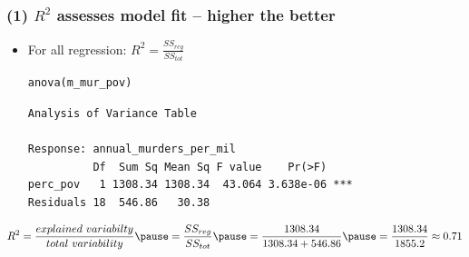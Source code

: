 \documentclass[slidestop,compress,mathserif,12pt,t,professionalfonts,xcolor=table]{beamer}
\begin{document}
\begin{frame}[fragile]
\frametitle{(1) $R^2$ assesses model fit -- higher the better}

\begin{itemize}

\item For all regression: $R^2 = \frac{SS_{reg}}{SS_{tot}}$

{\tiny
\begin{Verbatim}[frame=single, formatcom=\color{blue}]
anova(m_mur_pov)
\end{Verbatim}
}

{\tiny
\begin{Verbatim}[frame=single, formatcom=\color{gray}]
Analysis of Variance Table

Response: annual_murders_per_mil
          Df  Sum Sq Mean Sq F value    Pr(>F)    
perc_pov   1 1308.34 1308.34  43.064 3.638e-06 ***
Residuals 18  546.86   30.38  
\end{Verbatim}
}

\end{itemize}



\begin{adjustwidth}{-0.25cm}{0cm}
{\tiny
\[ R^2 = \frac{explained~variabilty}{total~variability} \pause =\frac{SS_{reg}}{SS_{tot}} \pause = \frac{1308.34}{1308.34 + 546.86} \pause = \frac{1308.34}{1855.2} \approx 0.71 \]
}
\end{adjustwidth}

\end{frame}
\end{document}

